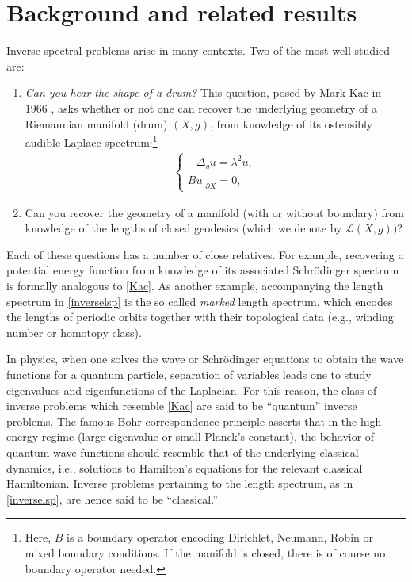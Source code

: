 \documentclass[11pt,letterpaper,oneside]{amsart}
\theoremstyle{definition}
\theoremstyle{remark}
\renewcommand{\d}{\partial}
\theoremstyle{definition}
\theoremstyle{remark}
\newcommand{\CL}{\mathcal{L}}
\begin{document}
\section{Background and related results}\label{sec:background}


Inverse spectral problems arise in many contexts. Two of the most well studied are:
\begin{enumerate}
	\item \label{Kac} \emph{Can you hear the shape of a drum?} This question, posed by Mark Kac in 1966 \cite{kac1966can}, asks whether or not one can recover the underlying geometry of a Riemannian manifold (drum) $(X,g)$, from knowledge of its ostensibly audible Laplace spectrum:\footnote{Here, $B$ is a boundary operator encoding Dirichlet, Neumann, Robin or mixed boundary conditions. If the manifold is closed, there is of course no boundary operator needed.}
	\begin{align*}
		\begin{cases}
			- \Delta_g u = \lambda^2 u,\\
			Bu|_{\d X} = 0,
		\end{cases}
	\end{align*}
	
	
	\item \label{inverselsp} Can you recover the geometry of a manifold (with or without boundary) from knowledge of the lengths of closed geodesics (which we denote by $\CL(X,g)$)?
\end{enumerate}

\medskip 

Each of these questions has a number of close relatives. For example, recovering a potential energy function from knowledge of its associated Schr\"odinger spectrum is formally analogous to \eqref{Kac}. As another example, accompanying the length spectrum in \eqref{inverselsp} is the so called \textit{marked} length spectrum, which encodes the lengths of periodic orbits together with their topological data (e.g., winding number or homotopy class).

\medskip

In physics, when one solves the wave or Schr\"odinger equations to obtain the wave functions for a quantum particle, separation of variables leads one to study eigenvalues and eigenfunctions of the Laplacian. For this reason, the class of inverse problems which resemble \eqref{Kac} are said to be ``quantum'' inverse problems. The famous Bohr correspondence principle asserts that in the high-energy regime (large eigenvalue or small Planck's constant), the behavior of quantum wave functions should resemble that of the underlying classical dynamics, i.e., solutions to Hamilton's equations for the relevant classical Hamiltonian. Inverse problems pertaining to the length spectrum, as in \eqref{inverselsp}, are hence said to be ``classical.''
\end{document}
